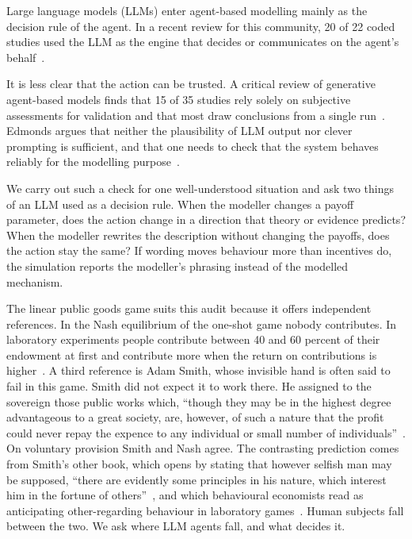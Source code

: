\documentclass[runningheads]{llncs}
\begin{document}
Large language models (LLMs) enter agent-based modelling mainly as the decision rule of the agent. In a recent review for this community, 20 of 22 coded studies used the LLM as the engine that decides or communicates on the agent's behalf~\cite{vanhee2026llmabm}.

It is less clear that the action can be trusted. A critical review of generative agent-based models finds that 15 of 35 studies rely solely on subjective assessments for validation and that most draw conclusions from a single run~\cite{larooij2026validation}. Edmonds argues that neither the plausibility of LLM output nor clever prompting is sufficient, and that one needs to check that the system behaves reliably for the modelling purpose~\cite{edmonds2026when}.

We carry out such a check for one well-understood situation and ask two things of an LLM used as a decision rule. When the modeller changes a payoff parameter, does the action change in a direction that theory or evidence predicts? When the modeller rewrites the description without changing the payoffs, does the action stay the same? If wording moves behaviour more than incentives do, the simulation reports the modeller's phrasing instead of the modelled mechanism.

The linear public goods game suits this audit because it offers independent references. In the Nash equilibrium of the one-shot game nobody contributes. In laboratory experiments people contribute between 40 and 60 percent of their endowment at first and contribute more when the return on contributions is higher~\cite{ledyard1995public,zelmer2003meta,isaac1988group}. A third reference is Adam Smith, whose invisible hand is often said to fail in this game. Smith did not expect it to work there. He assigned to the sovereign those public works which, ``though they may be in the highest degree advantageous to a great society, are, however, of such a nature that the profit could never repay the expence to any individual or small number of individuals''~\cite[V.i.c]{smith1776wealth}. On voluntary provision Smith and Nash agree. The contrasting prediction comes from Smith's other book, which opens by stating that however selfish man may be supposed, ``there are evidently some principles in his nature, which interest him in the fortune of others''~\cite[I.i.1]{smith1759moral}, and which behavioural economists read as anticipating other-regarding behaviour in laboratory games~\cite{ashraf2005smith}. Human subjects fall between the two. We ask where LLM agents fall, and what decides it.
\end{document}
